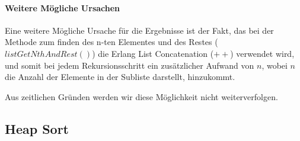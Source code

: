 \paragraph{Weitere Mögliche Ursachen}
Eine weitere Mögliche Ursache für die Ergebnisse ist der Fakt, das bei der
Methode zum finden des n-ten Elementes und des Restes (\(listGetNthAndRest()\))
die Erlang List Concatenation (\(++\)) verwendet wird, und somit bei jedem
Rekursionsschritt ein zusätzlicher Aufwand von \(n\), wobei \(n\) die
Anzahl der Elemente in der Subliste darstellt, hinzukommt.

Aus zeitlichen Gründen werden wir diese Möglichkeit nicht weiterverfolgen.

\FloatBarrier

\subsection{Heap Sort}\label{subsec:heap-sort-laufzeit}
